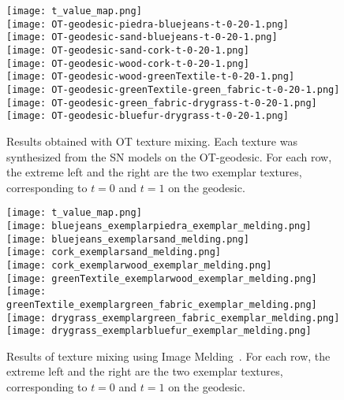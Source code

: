 \begin{figure}[ht!]
  \centering
  \texttt{[image: t\_value\_map.png]} \\
  \texttt{[image: OT-geodesic-piedra-bluejeans-t-0-20-1.png]} \\
  \texttt{[image: OT-geodesic-sand-bluejeans-t-0-20-1.png]} \\
  \texttt{[image: OT-geodesic-sand-cork-t-0-20-1.png]} \\
  \texttt{[image: OT-geodesic-wood-cork-t-0-20-1.png]} \\
  \texttt{[image: OT-geodesic-wood-greenTextile-t-0-20-1.png]}\\
  \texttt{[image: OT-geodesic-greenTextile-green\_fabric-t-0-20-1.png]} \\
  \texttt{[image: OT-geodesic-green\_fabric-drygrass-t-0-20-1.png]} \\
  \texttt{[image: OT-geodesic-bluefur-drygrass-t-0-20-1.png]}\\
  \caption{Results obtained with OT texture mixing. Each texture was synthesized from the SN models on the OT-geodesic. For each row, the extreme left and the right are the two exemplar textures, corresponding to $t=0$ and $t=1$ on the geodesic.
  }
  \label{fig-OT-mixing-static}
\end{figure}

\begin{figure}[ht!]
  \centering
  \texttt{[image: t\_value\_map.png]} \\
  \texttt{[image: bluejeans\_exemplarpiedra\_exemplar\_melding.png]} \\
  \texttt{[image: bluejeans\_exemplarsand\_melding.png]} \\
  \texttt{[image: cork\_exemplarsand\_melding.png]} \\
  \texttt{[image: cork\_exemplarwood\_exemplar\_melding.png]} \\
  \texttt{[image: greenTextile\_exemplarwood\_exemplar\_melding.png]}\\
  \texttt{[image: greenTextile\_exemplargreen\_fabric\_exemplar\_melding.png]} \\
  \texttt{[image: drygrass\_exemplargreen\_fabric\_exemplar\_melding.png]} \\
  \texttt{[image: drygrass\_exemplarbluefur\_exemplar\_melding.png]}\\
  \caption{Results of texture mixing using Image Melding~\cite{ImageMelding12}. %
  For each row, the extreme left and the right are the two exemplar textures, corresponding to $t=0$ and $t=1$ on the geodesic.
  }
  \label{fig-melding-static}
\end{figure}

